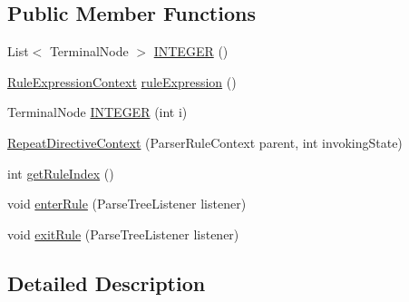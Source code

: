 \subsection*{Public Member Functions}
\begin{DoxyCompactItemize}
\item 
List$<$ Terminal\-Node $>$ \hyperlink{classit_1_1emarolab_1_1cagg_1_1core_1_1language_1_1parser_1_1ANTLRInterface_1_1ANTLRGenerated_1_c6d2080f9ca97ea76f0611a14f2333c9_ae7aae3f4545e8eb52f1e7fe36a5da56e}{I\-N\-T\-E\-G\-E\-R} ()
\item 
\hyperlink{classit_1_1emarolab_1_1cagg_1_1core_1_1language_1_1parser_1_1ANTLRInterface_1_1ANTLRGenerated_1_33ec65168ac4d70bbd7333bcd76218de}{Rule\-Expression\-Context} \hyperlink{classit_1_1emarolab_1_1cagg_1_1core_1_1language_1_1parser_1_1ANTLRInterface_1_1ANTLRGenerated_1_c6d2080f9ca97ea76f0611a14f2333c9_a0b727b9945650161caa8cd388be3f00c}{rule\-Expression} ()
\item 
Terminal\-Node \hyperlink{classit_1_1emarolab_1_1cagg_1_1core_1_1language_1_1parser_1_1ANTLRInterface_1_1ANTLRGenerated_1_c6d2080f9ca97ea76f0611a14f2333c9_af58e5e08b04abcdb0f24f4e395a23d0e}{I\-N\-T\-E\-G\-E\-R} (int i)
\item 
\hyperlink{classit_1_1emarolab_1_1cagg_1_1core_1_1language_1_1parser_1_1ANTLRInterface_1_1ANTLRGenerated_1_c6d2080f9ca97ea76f0611a14f2333c9_a7a6c86d4e095ce547cd97af8a63bcaf8}{Repeat\-Directive\-Context} (Parser\-Rule\-Context parent, int invoking\-State)
\item 
int \hyperlink{classit_1_1emarolab_1_1cagg_1_1core_1_1language_1_1parser_1_1ANTLRInterface_1_1ANTLRGenerated_1_c6d2080f9ca97ea76f0611a14f2333c9_abf2cab03b4f0b9981f653af7ec232e80}{get\-Rule\-Index} ()
\item 
void \hyperlink{classit_1_1emarolab_1_1cagg_1_1core_1_1language_1_1parser_1_1ANTLRInterface_1_1ANTLRGenerated_1_c6d2080f9ca97ea76f0611a14f2333c9_afbdeebd985c01d485b2039b36314f393}{enter\-Rule} (Parse\-Tree\-Listener listener)
\item 
void \hyperlink{classit_1_1emarolab_1_1cagg_1_1core_1_1language_1_1parser_1_1ANTLRInterface_1_1ANTLRGenerated_1_c6d2080f9ca97ea76f0611a14f2333c9_a8ffbdb9d2b2ed2915e113c6cdbd85283}{exit\-Rule} (Parse\-Tree\-Listener listener)
\end{DoxyCompactItemize}


\subsection{Detailed Description}


